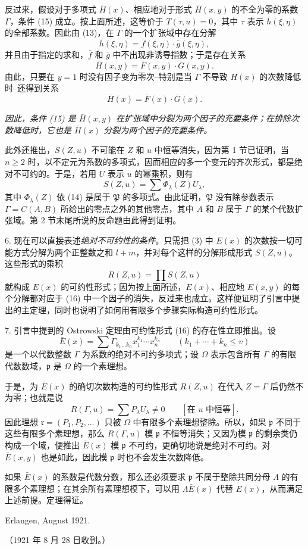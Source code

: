 反过来，假设对于多项式 $\bar H(x)$、相应地对于形式 $\bar H(x,y)$ 的不全为零的系数 $\Gamma$，条件 (15) 成立。按上面所述，这等价于 $T(\tau,u)=0$，其中 $\tau$ 表示 $\bar h(\xi,\eta)$ 的全部系数。因此由 (13)，在 $\Gamma$ 的一个扩张域中存在分解
\[
 \bar h(\xi,\eta)=\bar f(\xi,\eta)\cdot\bar g(\xi,\eta),
\]
并且由于指定的求和，$\bar f$ 和 $\bar g$ 中不出现非诱导指数；于是存在关系
\[
 \bar H(x,y)=\bar F(x,y)\cdot\bar G(x,y).
\]
由此，只要在 $y=1$ 时没有因子变为零次--特别是当 $\Gamma$ 不导致 $H(x)$ 的次数降低时--还得到关系
\[
 \bar H(x)=\bar F(x)\cdot\bar G(x).
\]

\emph{因此，条件 (15) 是 $\bar H(x,y)$ 在扩张域中分裂为两个因子的充要条件；在排除次数降低时，它也是 $\bar H(x)$ 分裂为两个因子的充要条件。}

此外还推出，$S(Z,u)$ 不可能在 $Z$ 和 $u$ 中恒等消失，因为第 1 节已证明，当 $n\ge2$ 时，以不定元为系数的多项式，因而相应的多一个变元的齐次形式，都是绝对不可约的。于是，若用 $U$ 表示 $u$ 的幂乘积，则有
\[
 S(Z,u)=\sum \Phi_\lambda(Z)U_\lambda,
\]
其中 $\Phi_\lambda(Z)$ 依 (14) 是属于 $\mathfrak P$ 的多项式。由此证明，$\mathfrak P$ 没有除参数表示 $\Gamma=C(A,B)$ 所给出的零点之外的其他零点，其中 $A$ 和 $B$ 属于 $\Gamma$ 的某个代数扩张域。第 2 节末尾所说的反命题由此得到证明。

6. 现在可以直接表述\emph{绝对不可约性的条件}。只需把 (3) 中 $E(x)$ 的次数按一切可能方式分解为两个正整数之和 $l+m$，并对每个这样的分解形成形式 $S(Z,u)$。这些形式的乘积
\begin{equation}
 R(Z,u)=\prod S(Z,u)
\tag{16}
\end{equation}
就构成 $E(x)$ 的可约性形式；因为按上面所述，$E(x)$、相应地 $E(x,y)$ 的每个分解都对应于 (16) 中一个因子的消失，反过来也成立。这样便证明了引言中提出的主定理，同时也说明了如何用有限多个步骤实际构造可约性形式。

7. 引言中提到的 Ostrowski 定理由可约性形式 (16) 的存在性立即推出。设
\[
 \bar E(x)=\sum \Gamma_{k_1\ldots k_n}x_1^{k_1}\cdots x_n^{k_n}
 \qquad(k_1+\cdots+k_n\le v)
\]
是一个以代数整数 $\Gamma$ 为系数的绝对不可约多项式；设 $\Omega$ 表示包含所有 $\Gamma$ 的有限代数数域，$\mathfrak p$ 是 $\Omega$ 的一个素理想。

于是，为 $\bar E(x)$ 的确切次数构造的可约性形式 $R(Z,u)$ 在代入 $Z=\Gamma$ 后仍然不为零；也就是说
\[
 R(\Gamma,u)=\sum P_\lambda U_\lambda\ne0\qquad[\text{在 }u\text{ 中恒等}].
\]
因此理想 $\mathfrak r=(P_1,P_2,\ldots)$ 只被 $\Omega$ 中有限多个素理想整除。所以，如果 $\mathfrak p$ 不同于这些有限多个素理想，那么 $R(\Gamma,u)$ 模 $\mathfrak p$ 不恒等消失；又因为模 $\mathfrak p$ 的剩余类仍构成一个域，便推出 $\bar E(x)$ 模 $\mathfrak p$ 不可约，更确切地说是绝对不可约。对 $\bar E(x,y)$ 也是如此，因此模 $\mathfrak p$ 时也不会发生次数降低。

如果 $\bar E(x)$ 的系数是代数分数，那么还必须要求 $\mathfrak p$ 不属于整除共同分母 $\Lambda$ 的有限多个素理想；在其余所有素理想模下，可以用 $\Lambda\bar E(x)$ 代替 $E(x)$，从而满足上述前提。定理得证。

\begin{flushleft}
Erlangen, August 1921.
\end{flushleft}
\begin{center}
（1921 年 8 月 28 日收到。）
\end{center}

\clearpage
